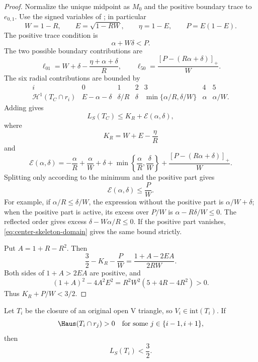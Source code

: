 \begin{proof}
Normalize the unique midpoint as $M_0$ and the positive boundary trace to
$e_{0,1}$.  Use the signed variables of
; in particular
\[
 W=1-R,\qquad E=\sqrt{1-RW},\qquad
 \eta=1-E,\qquad P=E(1-E).
\]
The positive trace condition is
\begin{equation}
 \alpha+W\delta<P.
 \label{eq:center-skeleton-domain}
\end{equation}
The two possible boundary contributions are
\[
 \ell_{01}=W+\delta-\frac{\eta+\alpha+\delta}{R},
 \qquad
 \ell_{50}=\frac{[P-(R\alpha+\delta)]_+}{W}.
\]
The six radial contributions are bounded by
\[
\begin{array}{c|cccccc}
 i&0&1&2&3&4&5\\ \hline
 \mathcal H^1(T_C\cap r_i)&
 E-\alpha-\delta&\delta/R&\delta&
 \min\{\alpha/R,\delta/W\}&\alpha&\alpha/W.
\end{array}
\]
Adding gives
\[
 L_S(T_C)\le K_R+\mathcal E(\alpha,\delta),
\]
where
\[
 K_R=W+E-\frac\eta R
\]
and
\[
 \mathcal E(\alpha,\delta)
 =-\frac\alpha R+\frac\alpha W+\delta
 +\min\left\{\frac\alpha R,\frac\delta W\right\}
 +\frac{[P-(R\alpha+\delta)]_+}{W}.
\]
Splitting only according to the minimum and the positive part gives
\begin{equation}
 \mathcal E(\alpha,\delta)\le\frac PW.
 \label{eq:center-skeleton-E-bound}
\end{equation}
For example, if $\alpha/R\le\delta/W$, the expression without the positive
part is $\alpha/W+\delta$; when the positive part is active, its excess over
$P/W$ is $\alpha-R\delta/W\le0$.  The reflected order gives excess
$\delta-W\alpha/R\le0$.  If the positive part vanishes,
\eqref{eq:center-skeleton-domain} gives the same bound strictly.

Put $A=1+R-R^2$.  Then
\[
 \frac32-K_R-\frac PW
 =\frac{1+A-2EA}{2RW}.
\]
Both sides of $1+A>2EA$ are positive, and
\[
 (1+A)^2-4A^2E^2
 =R^2W^2(5+4R-4R^2)>0.
\]
Thus $K_R+P/W<3/2$.
\end{proof}

\begin{lemma}
\label{lem:positive-support-skeleton-cap}
Let $T_i$ be the closure of an original open V triangle, so
$V_i\in\mathrm{int}(T_i)$.  If
\[
 \Haus(T_i\cap r_j)>0
 \quad\text{for some }j\in\{i-1,i+1\},
\]
then
\[
 L_S(T_i)<\frac32.
\]
\end{lemma}

